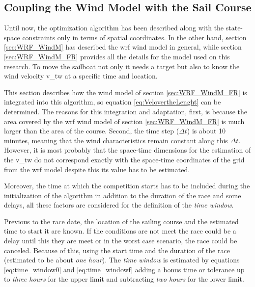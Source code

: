 \subsection{Coupling the Wind Model with the Sail Course} \label{sec:SailinArea_WindModel} %
Until now, the optimization algorithm has been described along with the state-space constraints only in terms of spatial coordinates. In the other hand, section \ref{sec:WRF_WindM} has described the \acrshort{wrf} wind model in general, while section \ref{sec:WRF_WindM_FR} provides all the details for the model used on this research. To move the sailboat not only it needs a target but also to know the wind velocity \acrshort{v_tw} at a specific time and location.\par \noindent %
This section describes how the wind model of section \ref{sec:WRF_WindM_FR} is integrated into this algorithm, so equation \ref{eq:VelovertheLenght} can be determined. The reasons for this integration and adaptation, first, is because the area covered by the \acrshort{wrf} wind model of section \ref{sec:WRF_WindM_FR} is much larger than the area of the course. Second, the time step ($\Delta t$) is about 10 minutes, meaning that the wind characteristics remain constant along this $\Delta t$. However, it is most probably that the space-time dimensions for the estimation of the \acrshort{v_tw} do not correspond exactly with the space-time coordinates of the grid from the \acrshort{wrf} model despite this its value has to be estimated. \par \noindent 
Moreover, the time at which the competition starts has to be included during the initialization of the algorithm in addition to the duration of the race and some delays, all these factors are considered for the definition of the \textit{time window}.\par

Previous to the race date, the location of the sailing course and the estimated time to start it are known. If the conditions are not meet the race could be a delay until this they are meet or in the worst case scenario, the race could be canceled. Because of this, using the start time and the duration of the race (estimated to be about \textit{one hour}). The \textit{time window} is estimated by equations \ref{eq:time_window0} and \ref{eq:time_windowf} adding a bonus time or tolerance up to \textit{three hours} for the upper limit and subtracting \textit{two hours} for the lower limit.\par

